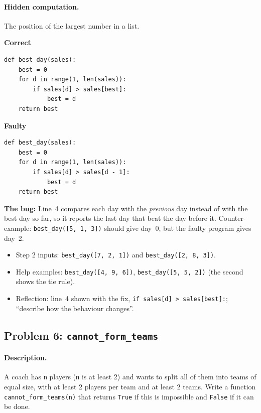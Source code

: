 \documentclass[11pt,a4paper]{article}
\newenvironment{codepair}{\par\noindent}{\par\medskip}
\newcommand{\codelabel}[1]{\textbf{\small #1}\par\vspace{2pt}}
\newcommand{\bugnote}[1]{\par\noindent\textcolor{bugred}{\textbf{The bug:}} #1\par\smallskip}
\begin{document}
\paragraph{Hidden computation.} The position of the largest number in a
list.

\begin{codepair}
\begin{minipage}[t]{0.48\textwidth}
\codelabel{Correct}
\begin{lstlisting}
def best_day(sales):
    best = 0
    for d in range(1, len(sales)):
        if sales[d] > sales[best]:
            best = d
    return best
\end{lstlisting}
\end{minipage}\hfill
\begin{minipage}[t]{0.48\textwidth}
\codelabel{Faulty}
\begin{lstlisting}
def best_day(sales):
    best = 0
    for d in range(1, len(sales)):
        if sales[d] > sales[d - 1]:
            best = d
    return best
\end{lstlisting}
\end{minipage}
\end{codepair}

\bugnote{Line~4 compares each day with the \emph{previous} day instead
of with the best day so far, so it reports the last day that beat the
day before it. Counter-example: \texttt{best\_day([5, 1, 3])} should give
day~0, but the faulty program gives day~2.}

\begin{itemize}[nosep]
  \item Step 2 inputs: \texttt{best\_day([7, 2, 1])} and
        \texttt{best\_day([2, 8, 3])}.
  \item Help examples: \texttt{best\_day([4, 9, 6])},
        \texttt{best\_day([5, 5, 2])} (the second shows the tie rule).
  \item Reflection: line~4 shown with the fix,
        \texttt{if sales[d] > sales[best]:}; ``describe how the behaviour
        changes''.
\end{itemize}

\subsection{Problem 6: \texttt{cannot\_form\_teams}}

\paragraph{Description.} A coach has \texttt{n} players (\texttt{n} is at
least 2) and wants to split all of them into teams of equal size, with at
least 2 players per team and at least 2 teams. Write a function
\texttt{cannot\_form\_teams(n)} that returns \texttt{True} if this is
impossible and \texttt{False} if it can be done.
\end{document}
